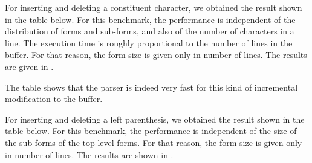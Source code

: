 For inserting and deleting a constituent character, we obtained the
result shown in the table below.  For this benchmark, the performance
is independent of the distribution of forms and sub-forms, and also of
the number of characters in a line.  The execution time is roughly
proportional to the number of lines in the buffer.  For that reason,
the form size is given only in number of lines.  The results are given in
.

\begin{table}[htb]
\end{table}


\noindent
The table shows that the parser is indeed very fast for this kind of
incremental modification to the buffer.

For inserting and deleting a left parenthesis, we obtained the
result shown in the table below.  For this benchmark, the performance
is independent of the size of the sub-forms of the top-level forms.
For that reason, the form size is given only in number of lines.
The results are shown in .

\begin{table}[htb]
\end{table}


